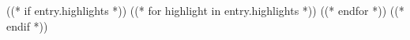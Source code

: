     ((* if entry.highlights *))
    \resumeListStart
      ((* for highlight in entry.highlights *))
      ((* endfor *))
    \resumeListEnd
    ((* endif *))
